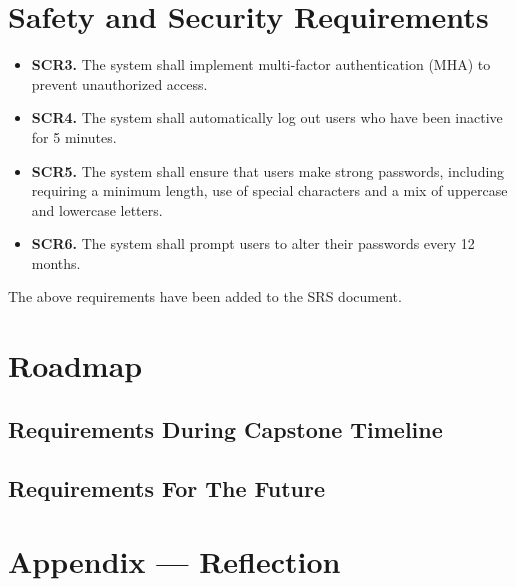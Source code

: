 \documentclass{article}
\begin{document}
\section{Safety and Security Requirements}
\begin{itemize}
    \item \textbf{SCR3.} The system shall implement multi-factor authentication (MHA) to prevent unauthorized access.
    \item \textbf{SCR4.} The system shall automatically log out users who have been inactive for 5 minutes.
    \item \textbf{SCR5.} The system shall ensure that users make strong passwords, including requiring a minimum length, use of special characters and a mix of uppercase and lowercase letters.
    \item \textbf{SCR6.} The system shall prompt users to alter their passwords every 12 months.
\end{itemize}
The above requirements have been added to the SRS document.

\section{Roadmap}

\subsection{Requirements During Capstone Timeline}


\subsection{Requirements For The Future}

\newpage{}

\section*{Appendix --- Reflection}



\end{document}
